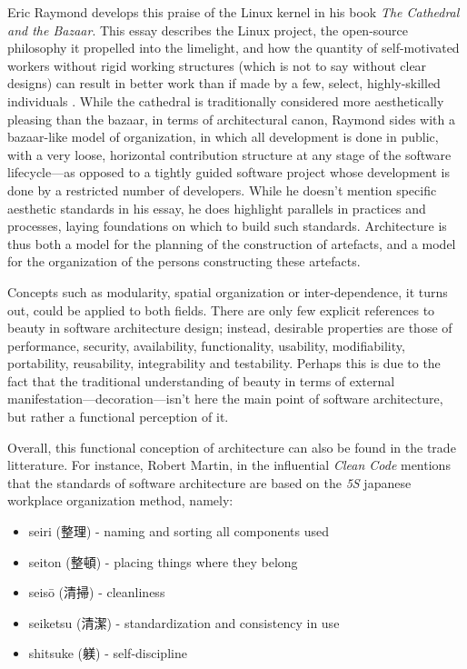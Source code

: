 Eric Raymond develops this praise of the Linux kernel in his book \emph{The Cathedral and the Bazaar}. This essay describes the Linux project, the open-source philosophy it propelled into the limelight, and how the quantity of self-motivated workers without rigid working structures (which is not to say without clear designs) can result in better work than if made by a few, select, highly-skilled individuals \citep{raymond_cathedral_2001}. While the cathedral is traditionally considered more aesthetically pleasing than the bazaar, in terms of architectural canon, Raymond sides with a bazaar-like model of organization, in which all development is done in public, with a very loose, horizontal contribution structure at any stage of the software lifecycle—as opposed to a tightly guided software project whose development is done by a restricted number of developers. While he doesn't mention specific aesthetic standards in his essay, he does highlight parallels in practices and processes, laying foundations on which to build such standards. Architecture is thus both a model for the planning of the construction of artefacts, and a model for the organization of the persons constructing these artefacts.

Concepts such as modularity, spatial organization or inter-dependence, it turns out, could be applied to both fields. There are only few explicit references to beauty in software architecture design; instead, desirable properties are those of performance, security, availability, functionality, usability, modifiability, portability, reusability, integrability and testability. Perhaps this is due to the fact that the traditional understanding of beauty in terms of external manifestation—decoration—isn't here the main point of software architecture, but rather a functional perception of it.

Overall, this functional conception of architecture can also be found in the trade litterature. For instance, Robert Martin, in the influential \emph{Clean Code} mentions that the standards of software architecture are based on the \emph{5S} japanese workplace organization method, namely:

\begin{itemize}
  \item{seiri ({\notocjk 整理}) - naming and sorting all components used}
  \item{seiton ({\notocjk 整頓}) - placing things where they belong}
  \item{seisō ({\notocjk 清掃}) - cleanliness}
  \item{seiketsu ({\notocjk 清潔}) - standardization and consistency in use}
  \item{shitsuke ({\notocjk 躾}) - self-discipline}
\end{itemize}

